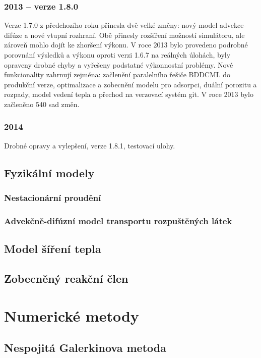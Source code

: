 \documentclass[11pt]{report}
\begin{document}
\subsubsection{2013 -- verze 1.8.0}
Verze 1.7.0 z předchozího roku přinesla dvě velké změny: nový model 
advekce-difúze a nové vtupní rozhraní. Obě přinesly rozšíření možností 
simulátoru, ale zároveň mohlo dojít ke zhoršení výkonu. V roce 2013 bylo 
provedeno podrobné porovnání výsledků a výkonu oproti verzi 1.6.7 na reálných 
úlohách, byly opraveny drobné chyby a vyřešeny podstatné výkonnostní problémy.  
Nové funkcionality zahrnují zejména: začlenění paralelního řešiče BDDCML do 
produkční verze, optimalizace a zobecnění modelu pro adsorpci, duální porozitu a 
rozpady, model vedení tepla a přechod na verzovací systém git. V roce 2013 bylo 
začleněno 540 sad změn.
\subsubsection{2014}
Drobné opravy a vylepšení, verze 1.8.1, testovací ulohy.

\subsection{Fyzikální modely}
\subsubsection{Nestacionární proudění}

\subsubsection{Advekčně-difúzní model transportu rozpuštěných látek}
\label{sc:transport_model}


\subsection{Model šíření tepla}
\label{sc:heat}


\subsection{Zobecněný reakční člen}

\section{Numerické metody}
\subsection{Nespojitá Galerkinova metoda}

\end{document}
